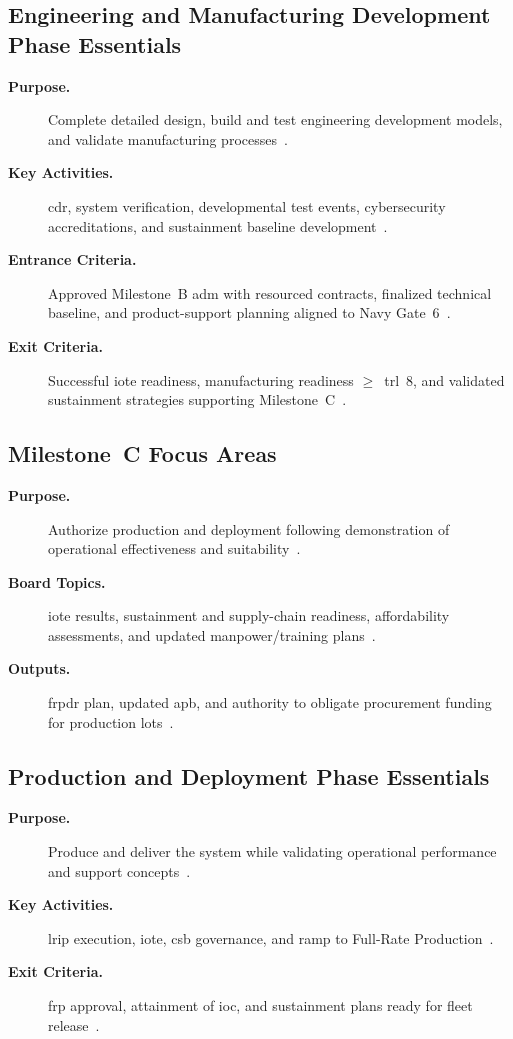 \documentclass[../main.tex]{subfiles}
\begin{document}
\subsection{Engineering and Manufacturing Development Phase Essentials}
\begin{description}
	\item[\textbf{Purpose.}] Complete detailed design, build and test engineering development models, and validate manufacturing processes~\autocite{DoDI5000-85}.
	\item[\textbf{Key Activities.}] \ac{cdr}, system verification, developmental test events, cybersecurity accreditations, and sustainment baseline development~\autocite{DoDI5000-85}.
	\item[\textbf{Entrance Criteria.}] Approved Milestone~B \ac{adm} with resourced contracts, finalized technical baseline, and product-support planning aligned to Navy Gate~6~\autocite{DoDI5000-85}.
	\item[\textbf{Exit Criteria.}] Successful \ac{iote} readiness, manufacturing readiness $\geq$~\ac{trl}~8, and validated sustainment strategies supporting Milestone~C~\autocite{DoDI5000-85}.
\end{description}

\subsection{Milestone~C Focus Areas}
\begin{description}
	\item[\textbf{Purpose.}] Authorize production and deployment following demonstration of operational effectiveness and suitability~\autocite{DoDI5000-85}.
	\item[\textbf{Board Topics.}] \ac{iote} results, sustainment and supply-chain readiness, affordability assessments, and updated manpower/training plans~\autocite{DoDI5000-85}.
	\item[\textbf{Outputs.}] \ac{frpdr} plan, updated \ac{apb}, and authority to obligate procurement funding for production lots~\autocite{DoDI5000-85}.
\end{description}

\subsection{Production and Deployment Phase Essentials}
\begin{description}
	\item[\textbf{Purpose.}] Produce and deliver the system while validating operational performance and support concepts~\autocite{DoDI5000-85}.
	\item[\textbf{Key Activities.}] \ac{lrip} execution, \ac{iote}, \ac{csb} governance, and ramp to Full-Rate Production~\autocite{DoDI5000-85}.
\item[\textbf{Exit Criteria.}] \ac{frp} approval, attainment of \ac{ioc}, and sustainment plans ready for fleet release~\autocite{DoDI5000-85}.
\end{description}
\end{document}

